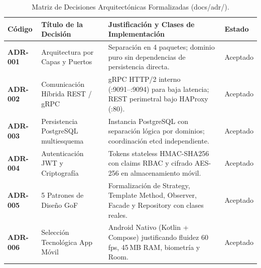 \documentclass[11pt,a4paper]{article}
\begin{document}
\begin{table}[H]
\centering
\caption{Matriz de Decisiones Arquitect\'onicas Formalizadas (docs/adr/).}
\label{tab:adrs-resumen}
\small
\begin{tabularx}{\textwidth}{|l|p{4.5cm}|X|l|}
\hline
\textbf{C\'odigo} & \textbf{T\'itulo de la Decisi\'on} & \textbf{Justificaci\'on y Clases de Implementaci\'on} & \textbf{Estado} \\
\hline
\textbf{ADR-001} & Arquitectura por Capas y Puertos & Separaci\'on en 4 paquetes; dominio puro sin dependencias de persistencia directa. & Aceptado \\
\hline
\textbf{ADR-002} & Comunicaci\'on H\'ibrida REST / gRPC & gRPC HTTP/2 interno (:9091--:9094) para baja latencia; REST perimetral bajo HAProxy (:80). & Aceptado \\
\hline
\textbf{ADR-003} & Persistencia PostgreSQL multiesquema & Instancia PostgreSQL con separaci\'on l\'ogica por dominios; coordinaci\'on etcd independiente. & Aceptado \\
\hline
\textbf{ADR-004} & Autenticaci\'on JWT y Criptograf\'ia & Tokens stateless HMAC-SHA256 con claims RBAC y cifrado AES-256 en almacenamiento m\'ovil. & Aceptado \\
\hline
\textbf{ADR-005} & 5 Patrones de Dise\~no GoF & Formalizaci\'on de Strategy, Template Method, Observer, Facade y Repository con clases reales. & Aceptado \\
\hline
\textbf{ADR-006} & Selecci\'on Tecnol\'ogica App M\'ovil & Android Nativo (Kotlin + Compose) justificando fluidez 60\,fps, 45\,MB RAM, biometr\'ia y Room. & Aceptado \\
\hline
\end{tabularx}
\end{table}
\end{document}
